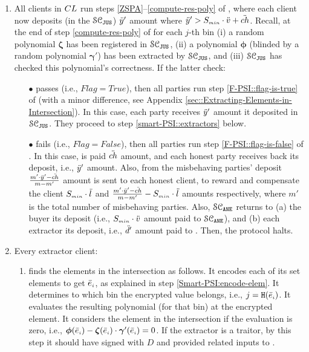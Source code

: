 \begin{enumerate}[leftmargin=4mm]
\item\label{e-psi::invoke-remainer-F-PSI} All clients in ${CL}$   run steps \ref{ZSPA}--\ref{compute-res-poly} of \fpsi, where each client now deposits (in the $\mathcal{SC}_{\mathtt{JUS}}$) $\ddot{y}'$ amount where $\ddot{y}'>S_{\scriptscriptstyle min}\cdot \ddot{v}+{\ddot{ch}}$. Recall, at the end of step \ref{compute-res-poly}  of \fpsi for each $j$-th bin (i) a random polynomial $\bm\zeta$ has been registered in $\mathcal{SC}_{\mathtt{JUS}}$, (ii) a polynomial $\bm\phi$ (blinded by a random polynomial $\bm\gamma'$) has been extracted by $\mathcal{SC}_{\mathtt{JUS}}$, and (iii) $\mathcal{SC}_{\mathtt{JUS}}$  has checked this polynomial's  correctness. If the latter check:

\begin{itemize}
\item[$\bullet$] passes (i.e., $Flag=True$), then all parties run step \ref{F-PSI::flag-is-true} of \fpsi (with a minor difference, see Appendix \ref{sec::Extracting-Elements-in-Intersection}).  In this case, each party receives $\ddot{y}'$ amount it deposited in $\mathcal{SC}_{\mathtt{JUS}}$. They proceed to step \ref{smart-PSI::extractors} below.

\item[$\bullet$]  fails (i.e., $Flag=False$), then all parties run step \ref{F-PSI::flag-is-false}  of \fpsi. In this case,
 \aud is paid $\ddot{ch}$ amount, and each honest party receives back its deposit, i.e., $\ddot{y}'$ amount. Also,  from the misbehaving parties' deposit  $\frac{m'\cdot \ddot{y}'-\ddot{ch}}{m-m'}$ amount is sent to each honest client,  to reward and compensate the client $S_{\scriptscriptstyle min}\cdot \ddot{l}$ and $\frac{m'\cdot \ddot{y}'-\ddot{ch}}{m-m'}- S_{\scriptscriptstyle min}\cdot \ddot{l}$ amounts respectively, where $m'$ is the total number of misbehaving parties.  Also, $\mathcal{SC}_{\mathtt{ANE}}$ returns to (a) the buyer its deposit (i.e., $S_{\scriptscriptstyle min}\cdot \ddot{v}$ amount paid to $\mathcal{SC}_{\mathtt{ANE}}$), and (b) each extractor its deposit, i.e., $\ddot{d}'$ amount paid to \SCpc. Then, the protocol halts. 
\end{itemize}

\item\label{smart-PSI::extractors} Every extractor client: 
\begin{enumerate}

\item finds the elements in the intersection as follows. It encodes each of its set elements to get $\bar e_{\scriptscriptstyle i}$, as explained in step \ref{Smart-PSI:encode-elem}.  
%
It determines to which bin the encrypted value belongs, i.e., ${ {  {j}}}=\mathtt{H}( \bar{e}_{\scriptscriptstyle i})$. It evaluates the resulting polynomial (for that bin) at the encrypted element. It considers the element in the intersection if the evaluation is zero, i.e., $\bm\phi( \bar{e}_{\scriptscriptstyle i})-\bm\zeta( \bar{e}_{\scriptscriptstyle i})\cdot \bm\gamma'( \bar{e}_{\scriptscriptstyle i})=0$. If the extractor is a traitor, by this step it should have signed \SCtc with $ { D}$ and provided related inputs to \SCtc. 


\end{enumerate}
\end{enumerate}
